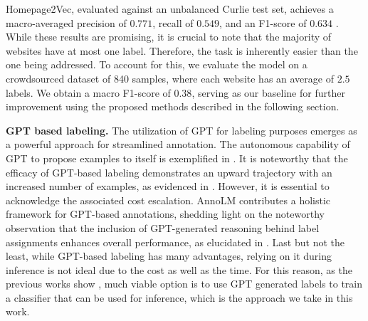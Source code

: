 Homepage2Vec, evaluated against an unbalanced Curlie test set, achieves a macro-averaged precision of $0.771$, recall of $0.549$, and an F1-score of $0.634$ \cite{homepage2vec}. While these results are promising, it is crucial to note that the majority of websites have at most one label. Therefore, the task is inherently easier than the one being addressed. To account for this, we evaluate the model on a crowdsourced dataset of 840 samples, where each website has an average of $2.5$ labels. We obtain a macro F1-score of $0.38$, serving as our baseline for further improvement using the proposed methods described in the following section.


\textbf{GPT based labeling.} The utilization of GPT for labeling purposes emerges as a powerful approach for streamlined annotation. The autonomous capability of GPT to propose examples to itself is exemplified in \cite{prompt-tuning}. It is noteworthy that the efficacy of GPT-based labeling demonstrates an upward trajectory with an increased number of examples, as evidenced in \cite{reduce-labeling-cost}. However, it is essential to acknowledge the associated cost escalation. AnnoLM contributes a holistic framework for GPT-based annotations, shedding light on the noteworthy observation that the inclusion of GPT-generated reasoning behind label assignments enhances overall performance, as elucidated in \cite{annollm}. 
Last but not the least, while GPT-based labeling has many advantages, relying on it during inference is not ideal due to the cost as well as the time. For this reason, as the previous works show \cite{reduce-labeling-cost,is-gpt3-good-annot}, much viable option is to use GPT generated labels to train a classifier that can be used for inference, which is the approach we take in this work.